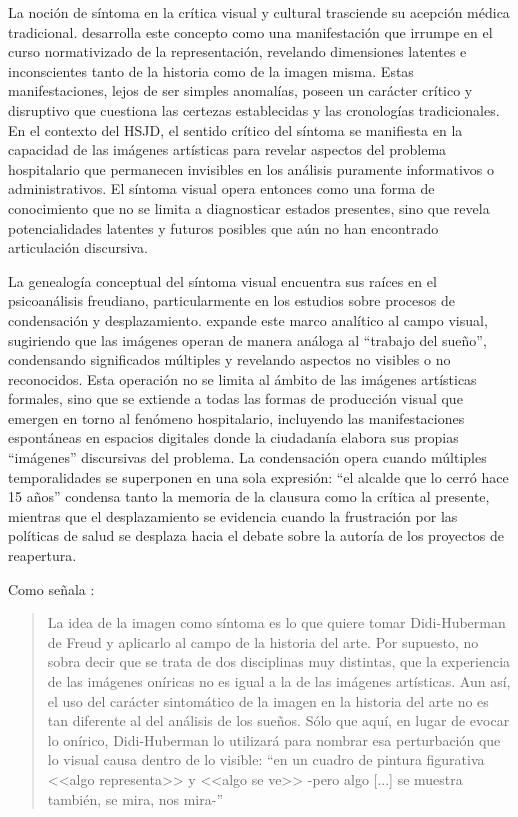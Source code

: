 La noción de síntoma en la crítica visual y cultural trasciende su acepción médica tradicional. \parencite{DidiHuberman2011} desarrolla este concepto como una manifestación que irrumpe en el curso \textcolor{edit30sept}{normativizado} de la representación, revelando dimensiones latentes e inconscientes tanto de la historia como de la imagen misma. Estas manifestaciones, lejos de ser simples anomalías, poseen un carácter crítico y disruptivo que cuestiona las certezas establecidas y las cronologías tradicionales. En el contexto del HSJD, el sentido crítico del síntoma se manifiesta en la capacidad de las imágenes artísticas para revelar aspectos del problema hospitalario que permanecen invisibles en los análisis puramente informativos o administrativos. El síntoma visual opera entonces como una forma de conocimiento que no se limita a diagnosticar estados presentes, sino que revela potencialidades latentes y futuros posibles que aún no han encontrado articulación discursiva.

La genealogía conceptual del síntoma visual encuentra sus raíces en el psicoanálisis freudiano, particularmente en los estudios sobre procesos de condensación y desplazamiento. \parencite{DidiHuberman2011} expande este marco analítico al campo visual, sugiriendo que las imágenes operan de manera análoga al ``trabajo del sueño'', condensando significados múltiples y revelando aspectos no visibles o no reconocidos. Esta operación no se limita al ámbito de las imágenes artísticas formales, sino que se extiende a todas las formas de producción visual que emergen en torno al fenómeno hospitalario, incluyendo las manifestaciones espontáneas en espacios digitales donde la ciudadanía elabora sus propias ``imágenes'' discursivas del problema. La condensación opera cuando múltiples temporalidades se superponen en una sola expresión: ``el alcalde que lo cerró hace 15 años'' condensa tanto la memoria de la clausura como la crítica al presente, mientras que el desplazamiento se evidencia cuando la frustración por las políticas de salud se desplaza hacia el debate sobre la autoría de los proyectos de reapertura.

Como señala \parencite[p. 37]{VegaArevalo2017}:

\begin{quote}
    La idea de la imagen como síntoma es lo que quiere tomar Didi-Huberman de Freud y aplicarlo al campo de la historia del arte. Por supuesto, no sobra decir que se trata de dos disciplinas muy distintas, que la experiencia de las imágenes oníricas no es igual a la de las imágenes artísticas. Aun así, el uso del carácter sintomático de la imagen en la historia del arte no es tan diferente al del análisis de los sueños. Sólo que aquí, en lugar de evocar lo onírico, Didi-Huberman lo utilizará para nombrar esa perturbación que lo visual causa dentro de lo visible: ``en un cuadro de pintura figurativa <<algo representa>> y <<algo se ve>> -pero algo [...] se muestra también, se mira, nos mira-''
\end{quote}

